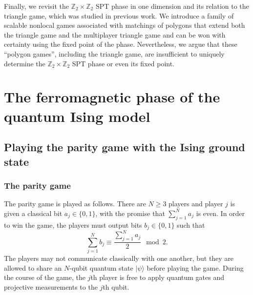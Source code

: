 \documentclass[prb,twocolumn,showpacs,amssymb,superscriptaddress]{revtex4-2}
\begin{document}
Finally, we revisit the $\mathbb{Z}_2 \times \mathbb{Z}_2$ SPT phase in one dimension and its relation to the triangle game, which was studied in previous work\cite{DanielMiyake}. We introduce a family of scalable nonlocal games associated with matchings of polygons that extend both the triangle game and the multiplayer triangle game and can be won with certainty using the fixed point of the phase. Nevertheless, we argue that these ``polygon games'', including the triangle game, are insufficient to uniquely determine the $\mathbb{Z}_2 \times \mathbb{Z}_2$ SPT phase or even its fixed point.

\section{The ferromagnetic phase of the quantum Ising model}
\label{sec:Ising}
\subsection{Playing the parity game with the Ising ground state}
\subsubsection{The parity game}
The parity game is played as follows\cite{brassard2005recasting}. There are $N \geq 3$ players and player $j$ is given a classical bit $a_j \in \{0,1\}$, with the promise that $\sum_{j=1}^N a_j$ is even. In order to win the game, the players must output bits $b_j \in \{0,1\}$ such that
\begin{equation}
\sum_{j=1}^N b_j \equiv \frac{\sum_{j=1}^N a_j}{2} \mod{2}.
\end{equation}
The players may not communicate classically with one another, but they are allowed to share an $N$-qubit quantum state $|\psi\rangle$ before playing the game. During the course of the game, the $j$th player is free to apply quantum gates and projective measurements to the $j$th qubit.
\end{document}
